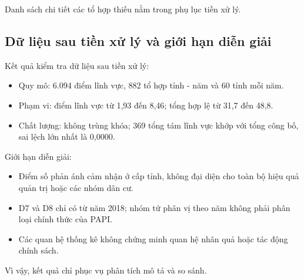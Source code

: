 Danh sách chi tiết các tổ hợp thiếu nằm trong phụ lục tiền xử lý.

\subsection{Dữ liệu sau tiền xử lý và giới hạn diễn giải}

Kết quả kiểm tra dữ liệu sau tiền xử lý:

\begin{itemize}
    \setlength{\itemsep}{0.2em}
    \setlength{\parskip}{0pt}
    \item Quy mô: 6.094 điểm lĩnh vực, 882 tổ hợp tỉnh - năm và 60 tỉnh mỗi năm.
    \item Phạm vi: điểm lĩnh vực từ 1,93 đến 8,46; tổng hợp lệ từ 31,7 đến 48,8.
    \item Chất lượng: không trùng khóa; 369 tổng tám lĩnh vực khớp với tổng công bố, sai lệch lớn nhất là 0,0000.
\end{itemize}

Giới hạn diễn giải:

\begin{itemize}
    \setlength{\itemsep}{0.2em}
    \setlength{\parskip}{0pt}
    \item Điểm số phản ánh cảm nhận ở cấp tỉnh, không đại diện cho toàn bộ hiệu quả quản trị hoặc các nhóm dân cư.
    \item D7 và D8 chỉ có từ năm 2018; nhóm tứ phân vị theo năm không phải phân loại chính thức của PAPI.
    \item Các quan hệ thống kê không chứng minh quan hệ nhân quả hoặc tác động chính sách.
\end{itemize}

Vì vậy, kết quả chỉ phục vụ phân tích mô tả và so sánh.
